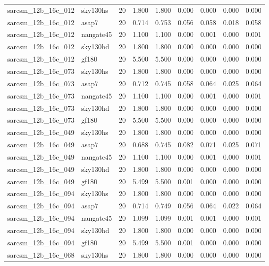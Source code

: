 \begin{tabular}{llrrrrrrr}
sarcsm\_12b\_16c\_012 & sky130hs & 20 & 1.800 & 1.800 & 0.000 & 0.000 & 0.000 & 0.000 \\
sarcsm\_12b\_16c\_012 & asap7 & 20 & 0.714 & 0.753 & 0.056 & 0.058 & 0.018 & 0.058 \\
sarcsm\_12b\_16c\_012 & nangate45 & 20 & 1.100 & 1.100 & 0.000 & 0.001 & 0.000 & 0.001 \\
sarcsm\_12b\_16c\_012 & sky130hd & 20 & 1.800 & 1.800 & 0.000 & 0.000 & 0.000 & 0.000 \\
sarcsm\_12b\_16c\_012 & gf180 & 20 & 5.500 & 5.500 & 0.000 & 0.000 & 0.000 & 0.000 \\
sarcsm\_12b\_16c\_073 & sky130hs & 20 & 1.800 & 1.800 & 0.000 & 0.000 & 0.000 & 0.000 \\
sarcsm\_12b\_16c\_073 & asap7 & 20 & 0.712 & 0.745 & 0.058 & 0.064 & 0.025 & 0.064 \\
sarcsm\_12b\_16c\_073 & nangate45 & 20 & 1.100 & 1.100 & 0.000 & 0.001 & 0.000 & 0.001 \\
sarcsm\_12b\_16c\_073 & sky130hd & 20 & 1.800 & 1.800 & 0.000 & 0.000 & 0.000 & 0.000 \\
sarcsm\_12b\_16c\_073 & gf180 & 20 & 5.500 & 5.500 & 0.000 & 0.000 & 0.000 & 0.000 \\
sarcsm\_12b\_16c\_049 & sky130hs & 20 & 1.800 & 1.800 & 0.000 & 0.000 & 0.000 & 0.000 \\
sarcsm\_12b\_16c\_049 & asap7 & 20 & 0.688 & 0.745 & 0.082 & 0.071 & 0.025 & 0.071 \\
sarcsm\_12b\_16c\_049 & nangate45 & 20 & 1.100 & 1.100 & 0.000 & 0.001 & 0.000 & 0.001 \\
sarcsm\_12b\_16c\_049 & sky130hd & 20 & 1.800 & 1.800 & 0.000 & 0.000 & 0.000 & 0.000 \\
sarcsm\_12b\_16c\_049 & gf180 & 20 & 5.499 & 5.500 & 0.001 & 0.000 & 0.000 & 0.000 \\
sarcsm\_12b\_16c\_094 & sky130hs & 20 & 1.800 & 1.800 & 0.000 & 0.000 & 0.000 & 0.000 \\
sarcsm\_12b\_16c\_094 & asap7 & 20 & 0.714 & 0.749 & 0.056 & 0.064 & 0.022 & 0.064 \\
sarcsm\_12b\_16c\_094 & nangate45 & 20 & 1.099 & 1.099 & 0.001 & 0.001 & 0.000 & 0.001 \\
sarcsm\_12b\_16c\_094 & sky130hd & 20 & 1.800 & 1.800 & 0.000 & 0.000 & 0.000 & 0.000 \\
sarcsm\_12b\_16c\_094 & gf180 & 20 & 5.499 & 5.500 & 0.001 & 0.000 & 0.000 & 0.000 \\
sarcsm\_12b\_16c\_068 & sky130hs & 20 & 1.800 & 1.800 & 0.000 & 0.000 & 0.000 & 0.000 \\

\end{tabular}
